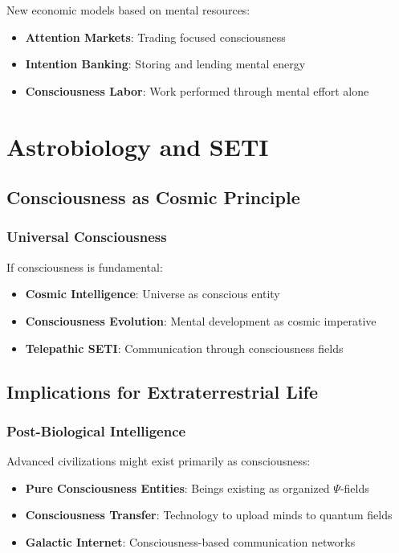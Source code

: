 \documentclass[12pt,article]{memoir}
\begin{document}
New economic models based on mental resources:

\begin{itemize}
    \item \textbf{Attention Markets}: Trading focused consciousness
    \item \textbf{Intention Banking}: Storing and lending mental energy
    \item \textbf{Consciousness Labor}: Work performed through mental effort alone
\end{itemize}

\chapter{Astrobiology and SETI}

\section{Consciousness as Cosmic Principle}

\subsection{Universal Consciousness}

If consciousness is fundamental:

\begin{itemize}
    \item \textbf{Cosmic Intelligence}: Universe as conscious entity
    \item \textbf{Consciousness Evolution}: Mental development as cosmic imperative
    \item \textbf{Telepathic SETI}: Communication through consciousness fields
\end{itemize}

\section{Implications for Extraterrestrial Life}

\subsection{Post-Biological Intelligence}

Advanced civilizations might exist primarily as consciousness:

\begin{itemize}
    \item \textbf{Pure Consciousness Entities}: Beings existing as organized $\Psi$-fields
    \item \textbf{Consciousness Transfer}: Technology to upload minds to quantum fields
    \item \textbf{Galactic Internet}: Consciousness-based communication networks
\end{itemize}
\end{document}
